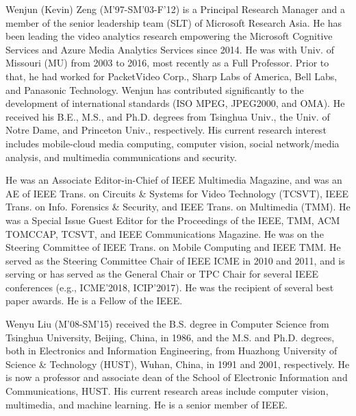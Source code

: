 \documentclass[journal]{IEEEtran}
\begin{document}
\begin{IEEEbiography}{Wenjun (Kevin) Zeng}
	 (M'97-SM'03-F'12) is a Principal Research Manager and a member of the senior leadership team (SLT) of Microsoft Research Asia. He has been leading the video analytics research empowering the Microsoft Cognitive Services and Azure Media Analytics Services since 2014. He was with Univ. of Missouri (MU) from 2003 to 2016, most recently as a Full Professor. Prior to that, he had worked for PacketVideo Corp., Sharp Labs of America, Bell Labs, and Panasonic Technology. Wenjun has contributed significantly to the development of international standards (ISO MPEG, JPEG2000, and OMA).  He received his B.E., M.S., and Ph.D. degrees from Tsinghua Univ., the Univ. of Notre Dame, and Princeton Univ., respectively.  His current research interest includes mobile-cloud media computing, computer vision, social network/media analysis, and multimedia communications and security.
	
	He was an Associate Editor-in-Chief of IEEE Multimedia Magazine, and was an AE of IEEE Trans. on Circuits \& Systems for Video Technology (TCSVT), IEEE Trans. on Info. Forensics \& Security, and IEEE Trans. on Multimedia (TMM). He was a Special Issue Guest Editor for the Proceedings of the IEEE, TMM, ACM TOMCCAP, TCSVT, and IEEE Communications Magazine. He was on the Steering Committee of IEEE Trans. on Mobile Computing and IEEE TMM. He served as the Steering Committee Chair of IEEE ICME in 2010 and 2011, and is serving or has served as the General Chair or TPC Chair for several IEEE conferences (e.g., ICME'2018, ICIP'2017).  He was the recipient of several best paper awards. He is a Fellow of the IEEE.
\end{IEEEbiography}

\begin{IEEEbiography}{Wenyu Liu}
	(M'08-SM'15) received the B.S. degree in Computer Science from Tsinghua University, Beijing, China, in 1986, and the M.S. and Ph.D. degrees, both in Electronics and Information Engineering, from Huazhong University of Science \& Technology (HUST), Wuhan, China, in 1991 and 2001, respectively. He is now a professor and associate dean of the School of Electronic Information and Communications, HUST. His current research areas include computer vision, multimedia, and machine learning. He is a senior member of IEEE.
\end{IEEEbiography}
	
\end{document}
